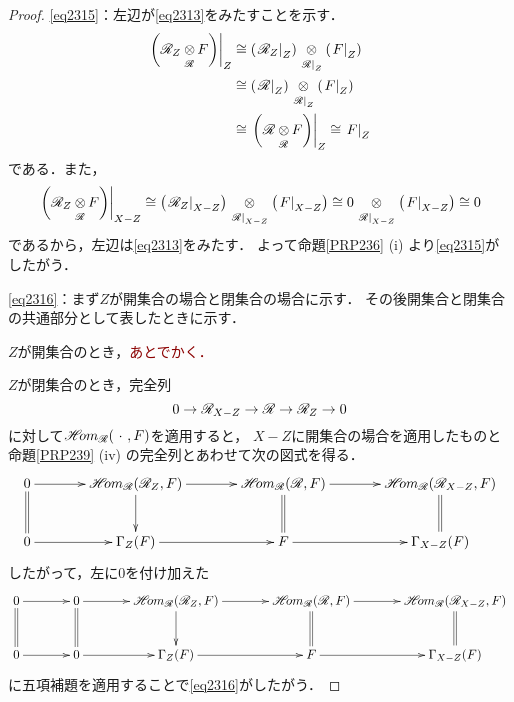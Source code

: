 \begin{proof}
    \eqref{eq2315}：左辺が\eqref{eq2313}をみたすことを示す．
    \begin{align*}
        \mres[{\left(\scR_{Z}\ttens[\scR]F\right)}]{Z}
        &\cong
        \left(\mres[\scR_{Z}]{Z}\right)\ttens[{\mres[\scR]{Z}}]\left(\mres[F]{Z}\right)\\
        &\cong
        \left(\mres[\scR]{Z}\right)\ttens[{\mres[\scR]{Z}}]\left(\mres[F]{Z}\right)\\
        &\cong
        \mres[{\left(\scR\ttens[\scR]F\right)}]{Z}
        \cong
        \mres[F]{Z}
    \end{align*}
    である．また，\[
        \mres[{\left(\scR_{Z}\ttens[\scR]F\right)}]{X-Z}
        \cong
        \left(\mres[\scR_{Z}]{X-Z}\right)\ttens[{\mres[\scR]{X-Z}}]\left(\mres[F]{X-Z}\right)
        \cong
        0\ttens[{\mres[\scR]{X-Z}}]\left(\mres[F]{X-Z}\right)
        \cong
        0
    \]
    であるから，左辺は\eqref{eq2313}をみたす．
    よって命題\ref{PRP236} (i) より\eqref{eq2315}がしたがう．

    \eqref{eq2316}：まず\(Z\)が開集合の場合と閉集合の場合に示す．
    その後開集合と閉集合の共通部分として表したときに示す．

    \(Z\)が開集合のとき，\textcolor{darkred}{あとでかく．}

    \(Z\)が閉集合のとき，完全列\[
        0\to \mathscr{R}_{X-Z}\to\mathscr{R}\to\mathscr{R}_{Z}\to 0
    \]に対して\(\mathop{\mathscr{H}\hspace{-2pt}om}\nolimits_{\mathscr{R}}(\mathord{\ \cdot\ },F)\)を適用すると，
    \(X-Z\)に開集合の場合を適用したものと
    命題\ref{PRP239} (iv) の完全列とあわせて次の図式を得る．
    \[\vcenter{\xymatrix@C=36pt@R=26pt{
            0
            \ar[r]^-{}
            \ar@{=}[d]_-{}
            &
            \HOM_{\scR}(\scR_{Z},F)\ar[r]_-{}
            \ar[d]_-{}
            &
            \HOM_{\scR}(\scR,F)\ar[r]_-{}
            \ar@{=}[d]_-{}
            &
            \HOM_{\scR}(\scR_{X-Z},F)
            \ar@{=}[d]_-{}
            \\
            0\ar[r]_-{}
            &
            \Gamma_{Z}(F)\ar[r]_-{}
            &
            F\ar[r]_-{}
            &
            \Gamma_{X-Z}(F)
    }}\]
    したがって，左に0を付け加えた
    \[\vcenter{\xymatrix@C=36pt@R=26pt{
        0
        \ar[r]^-{}
        \ar@{=}[d]_-{}
        &
        0
        \ar[r]^-{}
        \ar@{=}[d]_-{}
        &
        \HOM_{\scR}(\scR_{Z},F)\ar[r]_-{}
        \ar[d]_-{}
        &
        \HOM_{\scR}(\scR,F)\ar[r]_-{}
        \ar@{=}[d]_-{}
        &
        \HOM_{\scR}(\scR_{X-Z},F)
        \ar@{=}[d]_-{}
        \\
        0
        \ar[r]^-{}
        &
        0\ar[r]_-{}
        &
        \Gamma_{Z}(F)\ar[r]_-{}
        &
        F\ar[r]_-{}
        &
        \Gamma_{X-Z}(F)
    }}\]
    に五項補題を適用することで\eqref{eq2316}がしたがう．


\end{proof}
